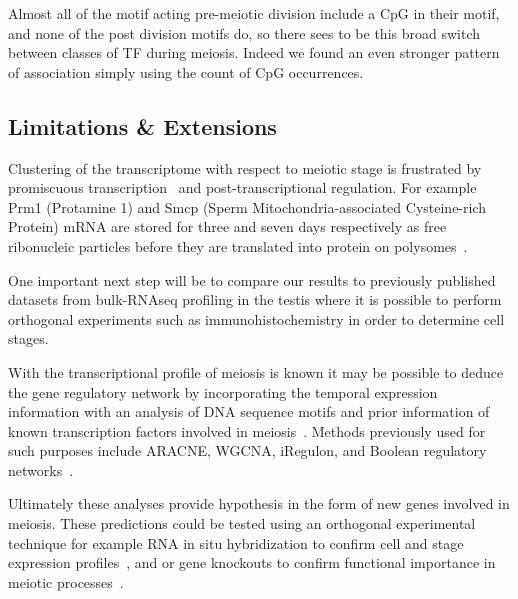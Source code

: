 Almost all of the motif acting pre-meiotic division include a CpG in their motif, and none of the post division motifs do, so there sees to be this broad switch between classes of TF during meiosis. Indeed we found an even stronger pattern of association simply using the count of CpG occurrences.



\subsection{Limitations \& Extensions}
Clustering of the transcriptome with respect to meiotic stage is frustrated by promiscuous transcription~\cite{Soumillon2013Cellular} and post-transcriptional regulation. For example Prm1 (Protamine 1) and Smcp (Sperm Mitochondria-associated Cysteine-rich Protein) mRNA are stored for three and seven days respectively as free ribonucleic particles before they are translated into protein on polysomes~\cite{Cullinane2015Mechanisms, Kleene1984Translational, Kleene2004Patterns}.



One important next step will be to compare our results to previously published datasets from bulk-RNAseq profiling in the testis where it is possible to perform orthogonal experiments such as immunohistochemistry in order to determine cell stages.


With the transcriptional profile of meiosis is known it may be possible to deduce the gene regulatory network by incorporating the temporal expression information with an analysis of DNA sequence motifs and prior information of known transcription factors involved in meiosis~\cite{Padovan-Merhar2013Using, Goutsias2007Computational}. Methods previously used for such purposes include ARACNE, WGCNA, iRegulon, and Boolean regulatory networks~\cite{Margolin2006Reverse, Zhang2005General, Janky2014iRegulon, Moignard2013Characterization}.

Ultimately these analyses provide hypothesis in the form of new genes involved in meiosis. These predictions could be tested using an orthogonal experimental technique for example RNA in situ hybridization to confirm cell and stage expression profiles~\cite{Moffitt2016Highperformance,Choi2016Mapping}, and or gene knockouts to confirm functional importance in meiotic processes~\cite{Jamsai2010Mouse}.
